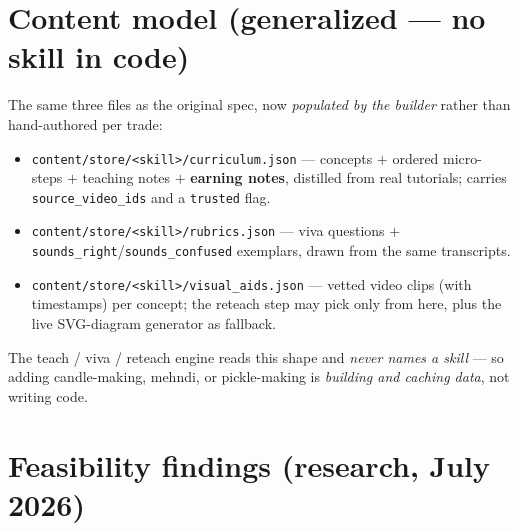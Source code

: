 \documentclass[11pt]{article}
\newcommand{\code}[1]{\texttt{#1}}
\begin{document}
\section{Content model (generalized --- no skill in code)}

The same three files as the original spec, now \emph{populated by the builder} rather than
hand-authored per trade:

\begin{itemize}
  \item \code{content/store/<skill>/curriculum.json} --- concepts $+$ ordered micro-steps $+$
  teaching notes $+$ \textbf{earning notes}, distilled from real tutorials; carries
  \code{source\_video\_ids} and a \code{trusted} flag.
  \item \code{content/store/<skill>/rubrics.json} --- viva questions $+$
  \code{sounds\_right}/\code{sounds\_confused} exemplars, drawn from the same transcripts.
  \item \code{content/store/<skill>/visual\_aids.json} --- vetted video clips (with timestamps) per
  concept; the reteach step may pick only from here, plus the live SVG-diagram generator as fallback.
\end{itemize}

\noindent The teach / viva / reteach engine reads this shape and \emph{never names a skill} --- so
adding candle-making, mehndi, or pickle-making is \emph{building and caching data}, not writing code.

\section{Feasibility findings (research, July 2026)}
\end{document}
